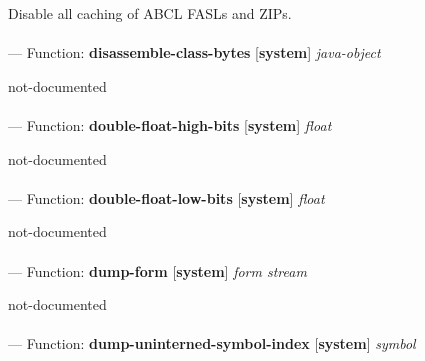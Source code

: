 \begin{adjustwidth}{5em}{5em}
Disable all caching of ABCL FASLs and ZIPs.
\end{adjustwidth}

\paragraph{}
\label{SYSTEM:DISASSEMBLE-CLASS-BYTES}
--- Function: \textbf{disassemble-class-bytes} [\textbf{system}] \textit{java-object}

\begin{adjustwidth}{5em}{5em}
not-documented
\end{adjustwidth}

\paragraph{}
\label{SYSTEM:DOUBLE-FLOAT-HIGH-BITS}
--- Function: \textbf{double-float-high-bits} [\textbf{system}] \textit{float}

\begin{adjustwidth}{5em}{5em}
not-documented
\end{adjustwidth}

\paragraph{}
\label{SYSTEM:DOUBLE-FLOAT-LOW-BITS}
--- Function: \textbf{double-float-low-bits} [\textbf{system}] \textit{float}

\begin{adjustwidth}{5em}{5em}
not-documented
\end{adjustwidth}

\paragraph{}
\label{SYSTEM:DUMP-FORM}
--- Function: \textbf{dump-form} [\textbf{system}] \textit{form stream}

\begin{adjustwidth}{5em}{5em}
not-documented
\end{adjustwidth}

\paragraph{}
\label{SYSTEM:DUMP-UNINTERNED-SYMBOL-INDEX}
--- Function: \textbf{dump-uninterned-symbol-index} [\textbf{system}] \textit{symbol}

